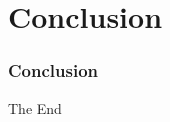 \section*{Conclusion}

\begin{frame}
    \frametitle{Conclusion}
    \Huge{\centerline{The End}}
\end{frame}
    
